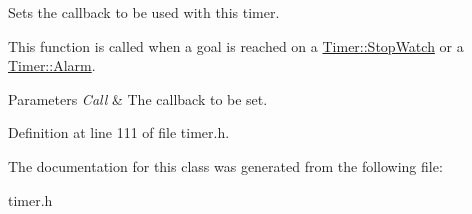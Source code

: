 Sets the callback to be used with this timer. 

This function is called when a goal is reached on a \hyperlink{classphys_1_1Timer_a1ee86bf43e20329d750c5d582dcce329a7599daa63100c2134df7d8b7c9b7f867}{Timer::StopWatch} or a \hyperlink{classphys_1_1Timer_a1ee86bf43e20329d750c5d582dcce329ae9b9fa35767e4ac2c87c078e1d9a0729}{Timer::Alarm}. 
\begin{DoxyParams}{Parameters}
{\em Call} & The callback to be set. \\
\hline
\end{DoxyParams}


Definition at line 111 of file timer.h.



The documentation for this class was generated from the following file:\begin{DoxyCompactItemize}
\item 
timer.h\end{DoxyCompactItemize}
